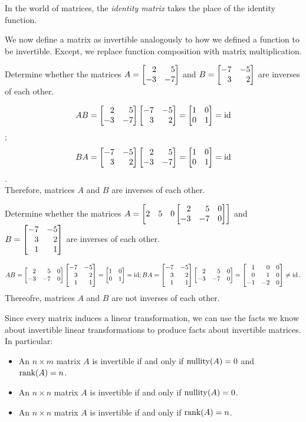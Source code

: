 
In the world of matrices, the \emph{identity matrix} takes the place of the identity function.


We now define a matrix as invertible analogously to how we defined a function to be invertible. 
Except, we replace function composition with matrix multiplication.


\begin{example}
	Determine whether the matrices $A=\mat{2&5\\-3&-7}$ and $B=\mat{-7&-5\\3&2}$ are inverses of each other.

	\[AB = \mat{2&5\\-3&-7}\mat{-7&-5\\3&2} =\mat{1&0\\0&1} = \Ident\];\\
	\[BA = \mat{-7&-5\\3&2}\mat{2&5\\-3&-7} =\mat{1&0\\0&1} = \Ident\].\\
	Therefore, matrices $A$ and $B$ are inverses of each other.
\end{example}

\begin{example}
	Determine whether the matrices $A=\mat{2&5&0\mat{2&5&0\\-3&-7&0}}$ and $B=\mat{-7&-5\\3&2\\1&1}$ are inverses of each other.
	
	\[
	    AB=\mat{2&5&0\\-3&-7&0}\mat{-7&-5\\3&2\\1&1}=\mat{1&0\\0&1}=\Ident;\\
	    BA=\mat{-7&-5\\3&2\\1&1}\mat{2&5&0\\-3&-7&0}=\mat{1&0&0\\0&1&0\\-1&-2&0}\neq\Ident .
	\]
	Thereofre, matrices $A$ and $B$ are not inverses of each other.
\end{example}

Since every matrix induces a linear transformation, we can use the facts we know about invertible linear
transformations to produce facts about invertible matrices. In particular:
\begin{itemize}
	\item An $n\times m$ matrix $A$ is invertible if and only if $\operatorname{nullity}(A)=0$ and $\operatorname{rank}(A)=n$.
	\item An $n\times n$ matrix $A$ is invertible if and only if $\operatorname{nullity}(A)=0$.
	\item An $n\times n$ matrix $A$ is invertible if and only if $\operatorname{rank}(A)=n$.
\end{itemize}


